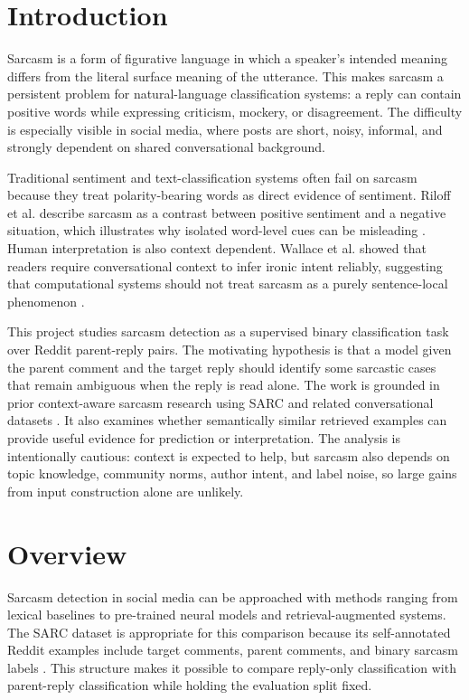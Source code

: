 \documentclass[%
 reprint,
 amsmath,amssymb,
 aps,
]{revtex4-2}
\begin{document}
\section{\label{sec:intro}Introduction} %

Sarcasm is a form of figurative language in which a speaker's intended meaning differs from the literal surface meaning of the utterance. This makes sarcasm a persistent problem for natural-language classification systems: a reply can contain positive words while expressing criticism, mockery, or disagreement. The difficulty is especially visible in social media, where posts are short, noisy, informal, and strongly dependent on shared conversational background.

Traditional sentiment and text-classification systems often fail on sarcasm because they treat polarity-bearing words as direct evidence of sentiment. Riloff et al. describe sarcasm as a contrast between positive sentiment and a negative situation, which illustrates why isolated word-level cues can be misleading \cite{riloff2013sarcasm}. Human interpretation is also context dependent. Wallace et al. showed that readers require conversational context to infer ironic intent reliably, suggesting that computational systems should not treat sarcasm as a purely sentence-local phenomenon \cite{wallace2014humans}.

This project studies sarcasm detection as a supervised binary classification task over Reddit parent-reply pairs. The motivating hypothesis is that a model given the parent comment and the target reply should identify some sarcastic cases that remain ambiguous when the reply is read alone. The work is grounded in prior context-aware sarcasm research using SARC and related conversational datasets \cite{khodak2018large,hazarika2018cascade,dong2020transformer,baruah2020context}. It also examines whether semantically similar retrieved examples can provide useful evidence for prediction or interpretation. The analysis is intentionally cautious: context is expected to help, but sarcasm also depends on topic knowledge, community norms, author intent, and label noise, so large gains from input construction alone are unlikely.

\section{\label{sec:overview}Overview} %

Sarcasm detection in social media can be approached with methods ranging from lexical baselines to pre-trained neural models and retrieval-augmented systems. The SARC dataset is appropriate for this comparison because its self-annotated Reddit examples include target comments, parent comments, and binary sarcasm labels \cite{khodak2018large}. This structure makes it possible to compare reply-only classification with parent-reply classification while holding the evaluation split fixed.
\end{document}
